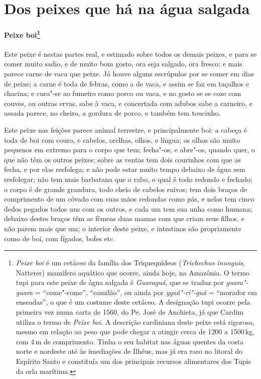 \section{Dos peixes que há na água salgada}
\paragraph{Peixe boi\footnote{ \textit{Peixe boi} é um cetáceo da
família dos Triquequídeos (\textit{Trichechus inunguis}, Natterer)
mamífero aquático que ocorre, ainda hoje, na Amazônia. O termo tupi
para este peixe de água salgada é \textit{Guaraguá}, que se
traduz por \textit{guara"-guara} = ``come"-come'', ``comilão'', ou ainda
por \textit{yguá"-ri"-guá} = ``morador em enseadas'', o que é um costume
deste cetáceo. A designação tupi ocorre pela primeira vez numa carta 
de 1560, do Pe. José de Anchieta, já que Cardim utiliza o termo
de \textit{Peixe boi.} A descrição cardiniana deste peixe está
rigorosa, mesmo em relação ao peso que pode chegar a atingir cerca de
1200 a 1500\,kg, com 4\,m de comprimento. Tinha o seu habitat nas águas
quentes da costa norte e nordeste até às imediações de Ilhéus, mas já
era raro no litoral do Espírito Santo e constituía um dos principais
recursos alimentares dos Tupis da orla marítima.}} Este
peixe é nestas partes real, e estimado sobre todos os demais peixes, e
para se comer muito sadio, e de muito bom gosto, ora seja salgado, ora
fresco; e mais parece carne de vaca que peixe. Já houve alguns
escrúpulos por se comer em dias de peixe; a carne é toda de febras,
como a de vaca, e assim se faz em taçalhos e chacina; e cura"-se ao
fumeiro como porco ou vaca, e no gosto se se coze com couves, ou outras
ervas, sabe à vaca, e concertada com adubos sabe a carneiro, e assada
parece, no cheiro, a gordura de porco, e também tem toucinho.

 Este peixe nas feições parece animal terrestre, e principalmente boi: a
cabeça é toda de boi com couro, e cabelos, orelhas, olhos, e língua; os
olhos são muito pequenos em extremo para o corpo que tem; fecha"-os, e
abre"-os, quando quer, o que não têm os outros peixes; sobre as ventas
tem dois courinhos com que as fecha, e por elas resfolega; e não pode
estar muito tempo debaixo de água sem resfolegar; não tem mais
barbatana que o rabo, o qual é todo redondo e fechado; o corpo é de
grande grandura, todo cheio de cabelos ruivos; tem dois braços de
comprimento de um côvado com suas mãos redondas como pás, e nelas tem
cinco dedos pegados todos uns com os outros, e cada um tem sua unha
como humana; debaixo destes braços têm as fêmeas duas mamas com que
criam seus filhos, e não parem mais que um; o interior deste peixe, e
intestinos são propriamente como de boi, com fígados, bofes etc.

